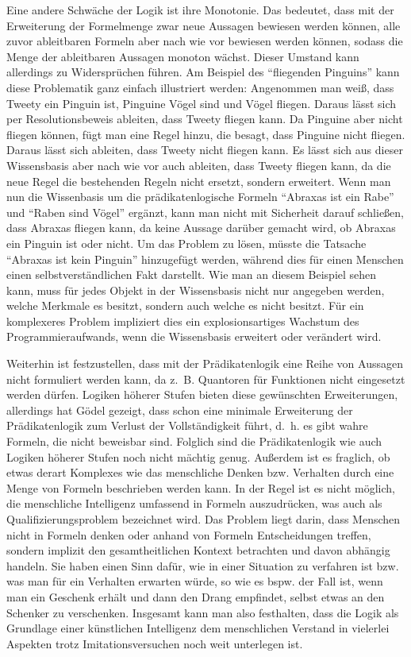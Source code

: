 Eine andere Schwäche der Logik ist ihre Monotonie.
Das bedeutet, dass mit der Erweiterung der Formelmenge zwar neue Aussagen bewiesen werden können, alle zuvor ableitbaren Formeln aber nach wie vor bewiesen werden können, sodass die Menge der ableitbaren Aussagen monoton wächst.
Dieser Umstand kann allerdings zu Widersprüchen führen.
Am Beispiel des "`fliegenden Pinguins"' kann diese Problematik ganz einfach illustriert werden:
Angenommen man weiß, dass Tweety ein Pinguin ist, Pinguine Vögel sind und Vögel fliegen.
Daraus lässt sich per Resolutionsbeweis ableiten, dass Tweety fliegen kann.
Da Pinguine aber nicht fliegen können, fügt man eine Regel hinzu, die besagt, dass Pinguine nicht fliegen.
Daraus lässt sich ableiten, dass Tweety nicht fliegen kann.
Es lässt sich aus dieser Wissensbasis aber nach wie vor auch ableiten, dass Tweety fliegen kann, da die neue Regel die bestehenden Regeln nicht ersetzt, sondern erweitert.
Wenn man nun die Wissenbasis um die prädikatenlogische Formeln "`Abraxas ist ein Rabe"' und "`Raben sind Vögel"' ergänzt, kann man nicht mit Sicherheit darauf schließen, dass Abraxas fliegen kann, da keine Aussage darüber gemacht wird, ob Abraxas ein Pinguin ist oder nicht.
Um das Problem zu lösen, müsste die Tatsache "`Abraxas ist kein Pinguin"' hinzugefügt werden, während dies für einen Menschen einen selbstverständlichen Fakt darstellt.
Wie man an diesem Beispiel sehen kann, muss für jedes Objekt in der Wissensbasis nicht nur angegeben werden, welche Merkmale es besitzt, sondern auch welche es nicht besitzt.
Für ein komplexeres Problem impliziert dies ein explosionsartiges Wachstum des Programmieraufwands, wenn die Wissensbasis erweitert oder verändert wird.

Weiterhin ist festzustellen, dass mit der Prädikatenlogik eine Reihe von Aussagen nicht formuliert werden kann, da z.~B.
Quantoren für Funktionen nicht eingesetzt werden dürfen.
Logiken
höherer Stufen bieten diese gewünschten Erweiterungen, allerdings hat Gödel gezeigt, dass
schon eine minimale Erweiterung der Prädikatenlogik zum Verlust der Vollständigkeit führt, d.~h.
es gibt wahre Formeln, die nicht beweisbar sind.
Folglich sind die Prädikatenlogik wie auch Logiken höherer Stufen noch nicht mächtig genug.
Außerdem ist es fraglich, ob etwas derart Komplexes wie das menschliche Denken bzw.
Verhalten durch eine Menge von Formeln beschrieben werden kann.
In der Regel ist es nicht möglich, die menschliche Intelligenz umfassend in Formeln auszudrücken, was auch als Qualifizierungsproblem bezeichnet wird.
Das Problem liegt darin, dass Menschen nicht in Formeln denken oder anhand von Formeln Entscheidungen treffen, sondern implizit den gesamtheitlichen Kontext betrachten und davon abhängig handeln.
Sie haben einen Sinn dafür, wie in einer Situation zu verfahren ist bzw.
was man für ein Verhalten erwarten würde, so wie es bspw.
der Fall ist, wenn man ein Geschenk erhält und dann den Drang empfindet, selbst etwas an den Schenker zu verschenken.
Insgesamt kann man also festhalten, dass die Logik als Grundlage einer künstlichen Intelligenz dem menschlichen Verstand in vielerlei Aspekten trotz Imitationsversuchen noch weit unterlegen ist.


